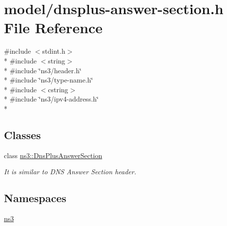 \hypertarget{dnsplus-answer-section_8h}{\section{model/dnsplus-\/answer-\/section.h File Reference}
\label{dnsplus-answer-section_8h}
}
{\ttfamily \#include $<$stdint.\-h$>$}\\*
{\ttfamily \#include $<$string$>$}\\*
{\ttfamily \#include \char`\"{}ns3/header.\-h\char`\"{}}\\*
{\ttfamily \#include \char`\"{}ns3/type-\/name.\-h\char`\"{}}\\*
{\ttfamily \#include $<$cstring$>$}\\*
{\ttfamily \#include \char`\"{}ns3/ipv4-\/address.\-h\char`\"{}}\\*
\subsection*{Classes}
\begin{DoxyCompactItemize}
\item 
class \hyperlink{classns3_1_1DnsPlusAnswerSection}{ns3\-::\-Dns\-Plus\-Answer\-Section}
\begin{DoxyCompactList}\small\item\em It is similar to D\-N\-S Answer Section header. \end{DoxyCompactList}\end{DoxyCompactItemize}
\subsection*{Namespaces}
\begin{DoxyCompactItemize}
\item 
\hyperlink{namespacens3}{ns3}
\end{DoxyCompactItemize}
